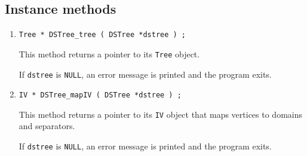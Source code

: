 \subsection{Instance methods}
\label{subsection:DSTree:proto:instance}
\par
\begin{enumerate}
\item
\begin{verbatim}
Tree * DSTree_tree ( DSTree *dstree ) ;
\end{verbatim}
This method returns a pointer to its {\tt Tree} object.
\par {}
If {\tt dstree} is {\tt NULL}, 
an error message is printed and the program exits.
\item
\begin{verbatim}
IV * DSTree_mapIV ( DSTree *dstree ) ;
\end{verbatim}
This method returns a pointer to its {\tt IV} object
that maps vertices to domains and separators.
\par {}
If {\tt dstree} is {\tt NULL}, 
an error message is printed and the program exits.
\end{enumerate}
\par
